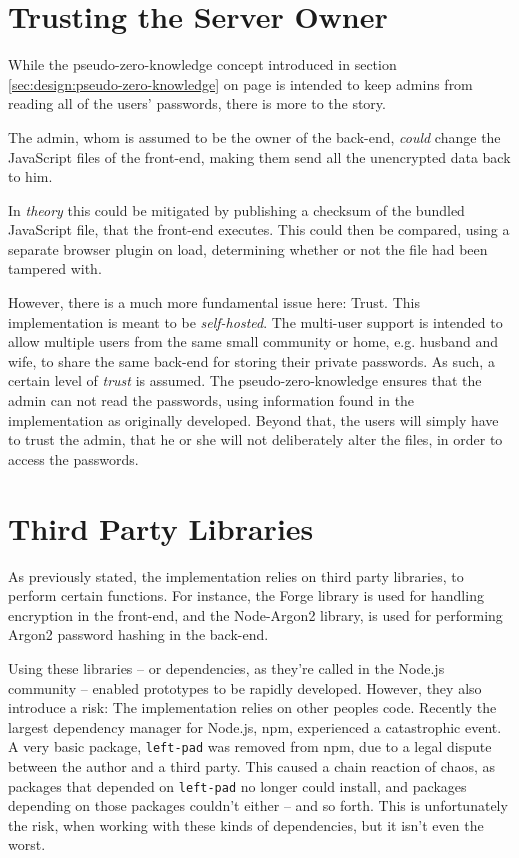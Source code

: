 	\section{Trusting the Server Owner}
		While the pseudo-zero-knowledge concept introduced in section \ref{sec:design:pseudo-zero-knowledge} on page \pageref{sec:design:pseudo-zero-knowledge} is intended to keep admins from reading all of the users' passwords, there is more to the story.

		The admin, whom is assumed to be the owner of the back-end, \emph{could} change the JavaScript files of the front-end, making them send all the unencrypted data back to him. 

		In \emph{theory} this could be mitigated by publishing a checksum of the bundled JavaScript file, that the front-end executes. This could then be compared, using a separate browser plugin on load, determining whether or not the file had been tampered with.

		However, there is a much more fundamental issue here: Trust. This implementation is meant to be \emph{self-hosted}. The multi-user support is intended to allow multiple users from the same small community or home, e.g. husband and wife, to share the same back-end for storing their private passwords. As such, a certain level of \emph{trust} is assumed. The pseudo-zero-knowledge ensures that the admin can not read the passwords, using information found in the implementation as originally developed. Beyond that, the users will simply have to trust the admin, that he or she will not deliberately alter the files, in order to access the passwords.

	\section{Third Party Libraries}
		As previously stated, the implementation relies on third party libraries, to perform certain functions. For instance, the Forge library is used for handling encryption in the front-end, and the Node-Argon2 library, is used for performing Argon2 password hashing in the back-end. 

		Using these libraries -- or dependencies, as they're called in the Node.js community -- enabled prototypes to be rapidly developed. However, they also introduce a risk: The implementation relies on other peoples code. Recently the largest dependency manager for Node.js, npm, experienced a catastrophic event. A very basic package, \verb=left-pad= was removed from npm, due to a legal dispute between the author and a third party\cite{npm_leftpad}. This caused a chain reaction of chaos, as packages that depended on \verb=left-pad= no longer could install, and packages depending on those packages couldn't either -- and so forth. This is unfortunately the risk, when working with these kinds of dependencies, but it isn't even the worst.

